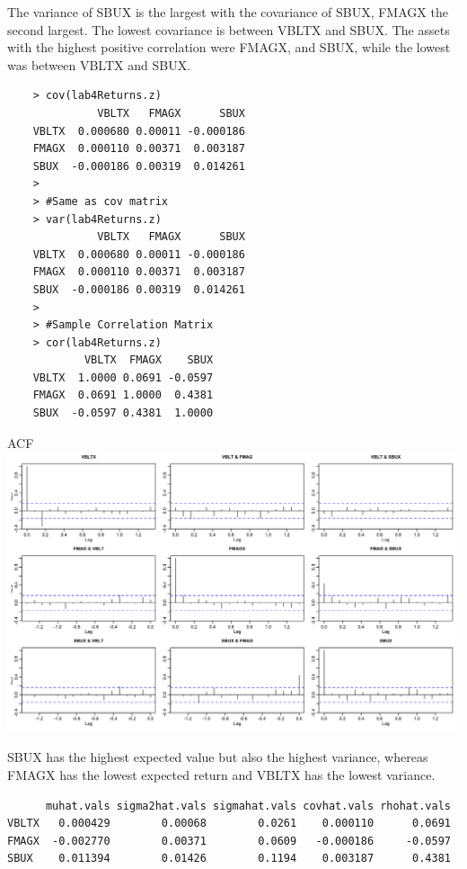 \documentclass[letterpaper,12pt]{article}
\begin{document}
\item The variance of SBUX is the largest with the covariance of SBUX, FMAGX the second largest. The lowest covariance is between VBLTX and SBUX. The assets with the highest positive correlation were FMAGX, and SBUX, while the lowest was between VBLTX and SBUX.
\begin{lstlisting}
    > cov(lab4Returns.z)
              VBLTX   FMAGX      SBUX
    VBLTX  0.000680 0.00011 -0.000186
    FMAGX  0.000110 0.00371  0.003187
    SBUX  -0.000186 0.00319  0.014261
    > 
    > #Same as cov matrix 
    > var(lab4Returns.z)
              VBLTX   FMAGX      SBUX
    VBLTX  0.000680 0.00011 -0.000186
    FMAGX  0.000110 0.00371  0.003187
    SBUX  -0.000186 0.00319  0.014261
    > 
    > #Sample Correlation Matrix
    > cor(lab4Returns.z)
            VBLTX  FMAGX    SBUX
    VBLTX  1.0000 0.0691 -0.0597
    FMAGX  0.0691 1.0000  0.4381
    SBUX  -0.0597 0.4381  1.0000
\end{lstlisting}

\item \hspace{18em} ACF \\
\includegraphics[scale = 0.35]{acf}

\item SBUX has the highest expected value but also the highest variance, whereas FMAGX has the lowest expected return and VBLTX has the lowest variance. 
\begin{lstlisting}
      muhat.vals sigma2hat.vals sigmahat.vals covhat.vals rhohat.vals
VBLTX   0.000429        0.00068        0.0261    0.000110      0.0691
FMAGX  -0.002770        0.00371        0.0609   -0.000186     -0.0597
SBUX    0.011394        0.01426        0.1194    0.003187      0.4381
\end{lstlisting}
\end{document}
